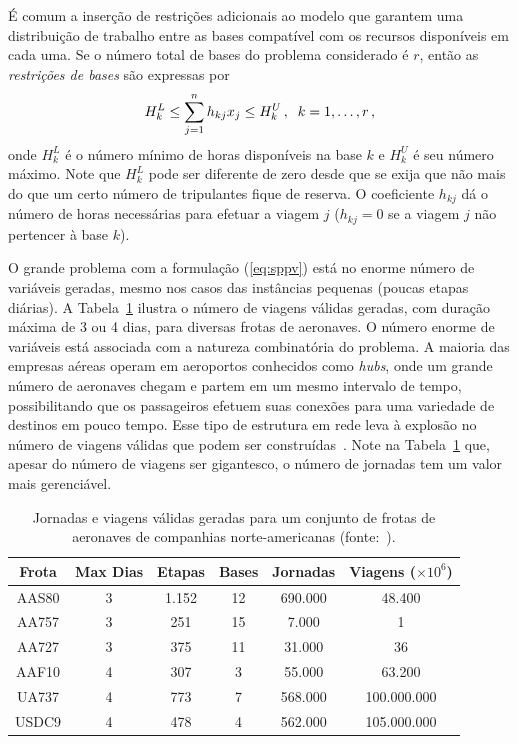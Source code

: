 É comum a inserção de restrições adicionais ao modelo que garantem uma distribuição de trabalho
entre as bases compatível com os recursos disponíveis em cada uma. Se o número total de bases do
problema considerado é $r$, então as \emph{restrições de bases} são expressas por
%
\begin{equation} \label{eq:bases}
	H_k^L \leq \sum_{j=1}^n h_{kj} x_j \leq H_k^U \, , \;\; k = 1, \ldots, r \, ,
\end{equation}
%
onde $H_k^L$ é o número mínimo de horas disponíveis na base $k$ e $H_k^U$ é seu número máximo. 
Note que $H_k^L$ pode ser diferente de zero desde que se exija que não mais do que um certo número 
de tripulantes fique de reserva. O coeficiente $h_{kj}$ dá o número de horas necessárias para 
efetuar a viagem $j$ ($h_{kj} = 0$ se a viagem $j$ não pertencer à base $k$).

O grande problema com a formulação (\ref{eq:sppv}) está no enorme número de variáveis geradas, mesmo
nos casos das instâncias pequenas (poucas etapas diárias). A Tabela~\ref{tab:viagens} ilustra o
número de viagens válidas geradas, com duração máxima de 3 ou 4 dias, para diversas frotas de
aeronaves. O número enorme de variáveis está associada com a natureza combinatória do problema. A
maioria das empresas aéreas operam em aeroportos conhecidos como \emph{hubs}, onde um grande número
de aeronaves chegam e partem em um mesmo intervalo de tempo, possibilitando que os passageiros
efetuem suas conexões para uma variedade de destinos em pouco tempo. Esse tipo de estrutura em rede 
leva à explosão no número de viagens válidas que podem ser construídas~\cite{graves93}. Note na
Tabela~\ref{tab:viagens} que, apesar do número de viagens ser gigantesco, o número de 
jornadas tem um valor mais gerenciável.

\begin{table}[ht]
	\begin{center}
		\begin{tabular}{|c||c|c|c|c|c|}
			\hline
			{\bf Frota} & {\bf Max Dias} & {\bf Etapas} & {\bf Bases} & {\bf Jornadas} & 
			{\bf Viagens} ($\times 10^6$) \\
			\hline
			AAS80 & 3 & 1.152 & 12 & 690.000 & 48.400 \\
			\hline
			AA757 & 3 & 251 & 15 & 7.000 & 1 \\
			\hline
			AA727 & 3 & 375 & 11 & 31.000 & 36 \\
			\hline
			AAF10 & 4 & 307 & 3 & 55.000 & 63.200 \\
			\hline 
			UA737 & 4 & 773 & 7 & 568.000 & 100.000.000 \\
			\hline
			USDC9 & 4 & 478 & 4 & 562.000 & 105.000.000 \\
			\hline
		\end{tabular}
		\caption{Jornadas e viagens válidas geradas para um conjunto de frotas de aeronaves
		de companhias norte-americanas (fonte:~\cite{anbil98}).}
		\label{tab:viagens}
	\end{center}
\end{table}

